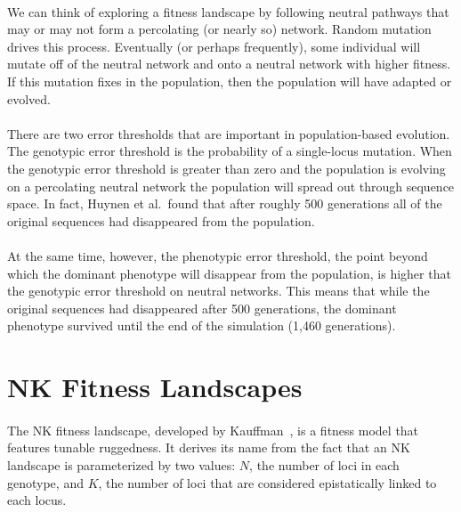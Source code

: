 \documentclass[12pt,letterpaper,titlepage]{article}
\begin{document}
\paragraph{}
We can think of exploring a fitness landscape by following neutral pathways
that may or may not form a percolating (or nearly so) network. Random mutation
drives this process. Eventually (or perhaps frequently), some individual will
mutate off of the neutral network and onto a neutral network with higher
fitness. If this mutation fixes in the population, then the population will
have adapted or evolved.

\paragraph{}
There are two error thresholds that are important in population-based
evolution. The genotypic error threshold is the probability of a single-locus
mutation. When the genotypic error threshold is greater than zero and the
population is evolving on a percolating neutral network the population will
spread out through sequence space. In fact, Huynen et al.\ found that after
roughly 500 generations all of the original sequences had disappeared from the
population.

\paragraph{}
At the same time, however, the phenotypic error threshold, the point beyond
which the dominant phenotype will disappear from the population, is higher that
the genotypic error threshold on neutral networks. This means that while the
original sequences had disappeared after 500 generations, the dominant
phenotype survived until the end of the simulation (1,460 generations).

\section{NK Fitness Landscapes}

\paragraph{}
The NK fitness landscape, developed by Kauffman~\cite{Kauffman1993}, is a
fitness model that features tunable ruggedness. It derives its name from the
fact that an NK landscape is parameterized by two values: $N$, the number of
loci in each genotype, and $K$, the number of loci that are considered
epistatically linked to each locus.
\end{document}
